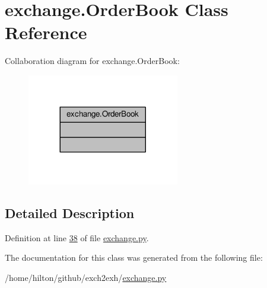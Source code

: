 \hypertarget{classexchange_1_1_order_book}{}\section{exchange.\+Order\+Book Class Reference}
\label{classexchange_1_1_order_book}


Collaboration diagram for exchange.\+Order\+Book\+:\nopagebreak
\begin{figure}[H]
\begin{center}
\leavevmode
\includegraphics[width=188pt]{classexchange_1_1_order_book__coll__graph}
\end{center}
\end{figure}


\subsection{Detailed Description}


Definition at line \hyperlink{exchange_8py_source_l00038}{38} of file \hyperlink{exchange_8py_source}{exchange.\+py}.



The documentation for this class was generated from the following file\+:\begin{DoxyCompactItemize}
\item 
/home/hilton/github/exch2exh/\hyperlink{exchange_8py}{exchange.\+py}\end{DoxyCompactItemize}

